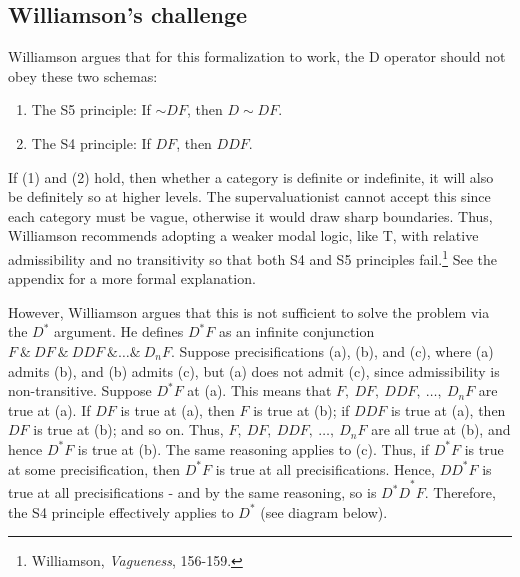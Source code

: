 \subsection{Williamson's challenge}

Williamson argues that for this formalization to work, the D operator
should not obey these two schemas:
\begin{enumerate}
\def\labelenumi{(\arabic{enumi})}
\item{The S5 principle: If ${\sim}DF$, then $D{\sim}DF$.}
\item{The S4 principle: If $DF$, then $DDF$.}
\end{enumerate}

If (1) and (2) hold, then whether a category is definite or indefinite,
it will also be definitely so at higher levels. The supervaluationist
cannot accept this since each category must be vague, otherwise it would
draw sharp boundaries. Thus, Williamson recommends adopting a weaker
modal logic, like T, with relative admissibility and no transitivity so
that both S4 and S5 principles fail.\footnote{Williamson,
  \emph{Vagueness}, 156-159.} See the appendix for a more formal
explanation.

However, Williamson argues that this is not sufficient to solve the
problem via the $D^*$ argument. He defines $D^{*}F$ as an infinite
conjunction $F \ \&  \ DF \ \& \ DDF \ \& \ldots \& \ D_{n}F$. Suppose
precisifications (a), (b), and (c), where (a) admits (b), and (b) admits
(c), but (a) does not admit (c), since admissibility is non-transitive.
Suppose $D^{*}F$ at (a). This means that
$F, \ DF, \ DDF, \ \ldots, \ D_{n}F$ are true at (a). If $DF$ is true at
(a), then $F$ is true at (b); if $DDF$ is true at (a), then $DF$
is true at (b); and so on. Thus, $F, \ DF, \ DDF, \ \ldots, \ D_{n}F$ are
all true at (b), and hence $D^{*}F$ is true at (b). The same reasoning
applies to (c). Thus, if $D^{*}F$ is true at some precisification,
then $D^{*}F$ is true at all precisifications. Hence, ${DD}^{*}F$ is
true at all precisifications - and by the same reasoning, so is
${D^{*}D}^{*}F$. Therefore, the S4 principle effectively applies to
$D^{*}$ (see diagram below).

